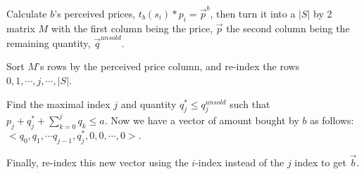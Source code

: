 \documentclass[14pt]{article}
\begin{document}
Calculate $b$'s perceived prices, $t_b(s_i) * p_i = \vec{p}^b$, then turn it
into a $|S|$ by 2 matrix $M$ with the first column being the price, $\vec{p}$
the second column being the remaining quantity, $\vec{q}^{unsold}$. 

Sort $M$'s rows by the perceived price column, and re-index the rows\newline
$0, 1, \cdots , j, \cdots , |S|$. 

Find the maximal index $j$ and quantity $q^{*}_j \le q^{unsold}_j$ such that
$p_j + q^{*}_j + \sum_{k=0}^j q_k \le a$.  Now we have a vector of amount
bought by $b$ as follows: $<q_0, q_1,\cdots q_{j-1}, q^{*}_j, 0, 0, \cdots, 0>.$

Finally, re-index this new vector using the $i$-index instead of the $j$ index
to get $\vec{b}$.
\end{document}
